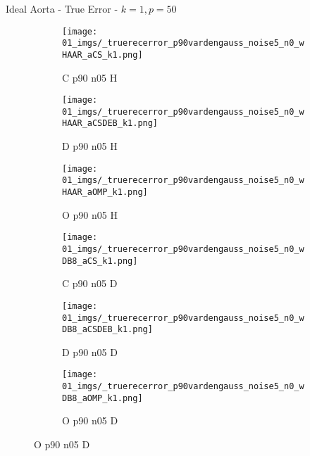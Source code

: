 \begin{frame}{Ideal Aorta - True Error - $k=1,p=50$}{}
\begin{figure}
\begin{subfigure}{0.13\textwidth}
\texttt{[image: 01\_imgs/\_truerecerror\_p90vardengauss\_noise5\_n0\_wHAAR\_aCS\_k1.png]}
\caption*{\tiny C p90 n05 H}
\end{subfigure}
\begin{subfigure}{0.13\textwidth}
\texttt{[image: 01\_imgs/\_truerecerror\_p90vardengauss\_noise5\_n0\_wHAAR\_aCSDEB\_k1.png]}
\caption*{\tiny D p90 n05 H}
\end{subfigure}
\begin{subfigure}{0.13\textwidth}
\texttt{[image: 01\_imgs/\_truerecerror\_p90vardengauss\_noise5\_n0\_wHAAR\_aOMP\_k1.png]}
\caption*{\tiny O p90 n05 H}
\end{subfigure}
\begin{subfigure}{0.13\textwidth}
\texttt{[image: 01\_imgs/\_truerecerror\_p90vardengauss\_noise5\_n0\_wDB8\_aCS\_k1.png]}
\caption*{\tiny C p90 n05 D}
\end{subfigure}
\begin{subfigure}{0.13\textwidth}
\texttt{[image: 01\_imgs/\_truerecerror\_p90vardengauss\_noise5\_n0\_wDB8\_aCSDEB\_k1.png]}
\caption*{\tiny D p90 n05 D}
\end{subfigure}
\begin{subfigure}{0.13\textwidth}
\texttt{[image: 01\_imgs/\_truerecerror\_p90vardengauss\_noise5\_n0\_wDB8\_aOMP\_k1.png]}
\caption*{\tiny O p90 n05 D}
\end{subfigure}

\vspace{5pt}


\end{figure}
\end{frame}
